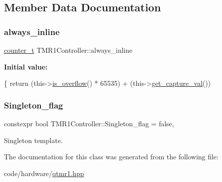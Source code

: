 \subsection{Member Data Documentation}
\mbox{\label{classTMR1Controller_adce8e8a496510485a88ccc5b88595672}} 
\subsubsection{\texorpdfstring{always\+\_\+inline}{always\_inline}}
{\footnotesize\ttfamily \hyperlink{types_8hpp_a22f279793847eba127de149437848c48}{counter\+\_\+t} T\+M\+R1\+Controller\+::always\+\_\+inline}

{\bfseries Initial value\+:}
\begin{DoxyCode}
\{
        \textcolor{keywordflow}{return} (this->\hyperlink{classTMR1Controller_a06052b4a881156be3c7a4b6495d8ca11}{is\_overflow}() * 65535) + (this->\hyperlink{classTMR1Controller_a3d07eed72365e7a7b44fadefb23b9ba6}{get\_capture\_val}())
\end{DoxyCode}
\mbox{\label{classTMR1Controller_a532b729ca9a7c28e5f4d221f80487241}} 
\subsubsection{\texorpdfstring{Singleton\+\_\+flag}{Singleton\_flag}}
{\footnotesize\ttfamily constexpr bool T\+M\+R1\+Controller\+::\+Singleton\+\_\+flag = false\hspace{0.3cm}{\ttfamily [static]}, {\ttfamily [private]}}



Singleton template. 



The documentation for this class was generated from the following file\+:\begin{DoxyCompactItemize}
\item 
code/hardware/\hyperlink{qtmr1_8hpp}{qtmr1.\+hpp}\end{DoxyCompactItemize}
